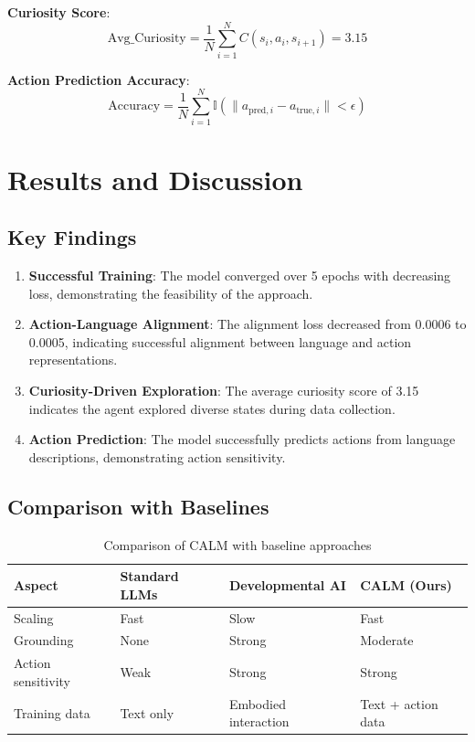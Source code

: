 \documentclass{IEEEtran}
\begin{document}
\textbf{Curiosity Score}:
\begin{equation}
\text{Avg\_Curiosity} = \frac{1}{N} \sum_{i=1}^N C(s_i, a_i, s_{i+1}) = 3.15
\end{equation}

\textbf{Action Prediction Accuracy}:
\begin{equation}
\text{Accuracy} = \frac{1}{N} \sum_{i=1}^N \mathbb{I}(\|a_{\text{pred},i} - a_{\text{true},i}\| < \epsilon)
\end{equation}

\section{Results and Discussion}

\subsection{Key Findings}

\begin{enumerate}
    \item \textbf{Successful Training}: The model converged over 5 epochs with decreasing loss, demonstrating the feasibility of the approach.
    \item \textbf{Action-Language Alignment}: The alignment loss decreased from 0.0006 to 0.0005, indicating successful alignment between language and action representations.
    \item \textbf{Curiosity-Driven Exploration}: The average curiosity score of 3.15 indicates the agent explored diverse states during data collection.
    \item \textbf{Action Prediction}: The model successfully predicts actions from language descriptions, demonstrating action sensitivity.
\end{enumerate}

\subsection{Comparison with Baselines}

\begin{table}[h]
\centering
\begin{tabular}{|l|l|l|l|}
\hline
\textbf{Aspect} & \textbf{Standard LLMs} & \textbf{Developmental AI} & \textbf{CALM (Ours)} \\
\hline
Scaling & Fast & Slow & Fast \\
\hline
Grounding & None & Strong & Moderate \\
\hline
Action sensitivity & Weak & Strong & Strong \\
\hline
Training data & Text only & Embodied interaction & Text + action data \\
\hline
\end{tabular}
\caption{Comparison of CALM with baseline approaches}
\end{table}
\end{document}
